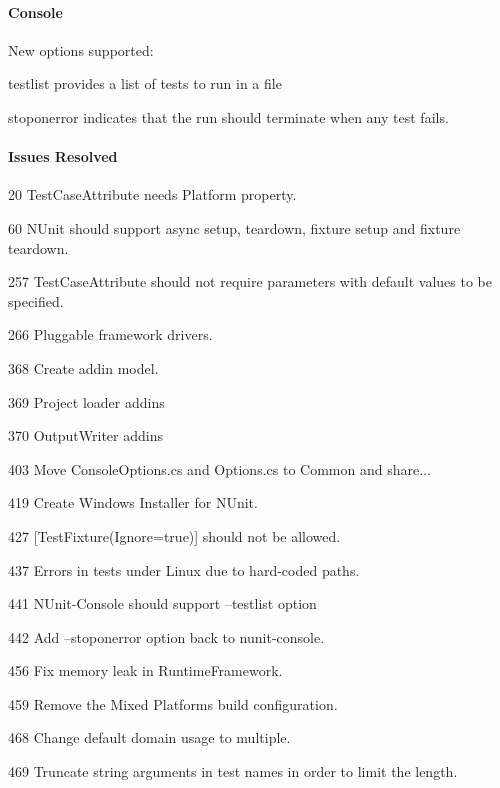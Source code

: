 \paragraph*{Console}


\begin{DoxyItemize}
\item New options supported\+:
\begin{DoxyItemize}
\item testlist provides a list of tests to run in a file
\item stoponerror indicates that the run should terminate when any test fails.
\end{DoxyItemize}
\end{DoxyItemize}

\paragraph*{Issues Resolved}


\begin{DoxyItemize}
\item 20 Test\+Case\+Attribute needs Platform property.
\item 60 N\+Unit should support async setup, teardown, fixture setup and fixture teardown.
\item 257 Test\+Case\+Attribute should not require parameters with default values to be specified.
\item 266 Pluggable framework drivers.
\item 368 Create addin model.
\item 369 Project loader addins
\item 370 Output\+Writer addins
\item 403 Move Console\+Options.\+cs and Options.\+cs to Common and share...
\item 419 Create Windows Installer for N\+Unit.
\item 427 [Test\+Fixture(Ignore=true)] should not be allowed.
\item 437 Errors in tests under Linux due to hard-\/coded paths.
\item 441 N\+Unit-\/\+Console should support --testlist option
\item 442 Add --stoponerror option back to nunit-\/console.
\item 456 Fix memory leak in Runtime\+Framework.
\item 459 Remove the Mixed Platforms build configuration.
\item 468 Change default domain usage to multiple.
\item 469 Truncate string arguments in test names in order to limit the length.
\end{DoxyItemize}

